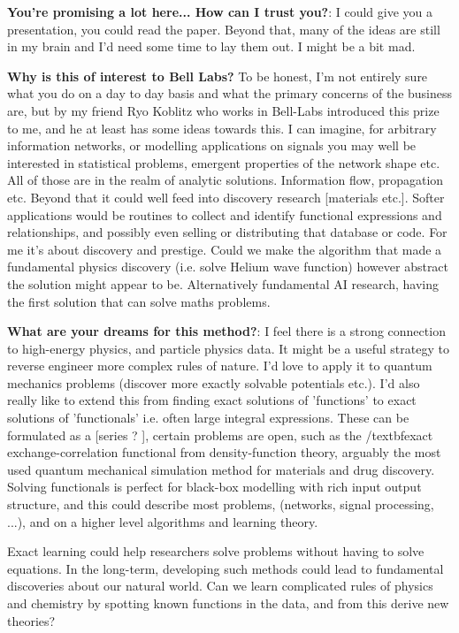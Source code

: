 \documentclass{article}
\begin{document}
\textbf{You're promising a lot here... How can I trust you?}: I could give you a presentation, you could read the paper. Beyond that, many of the ideas are still in my brain and I'd need some time to lay them out. I might be a bit mad. 

\textbf{Why is this of interest to Bell Labs?} To be honest, I'm not entirely sure what you do on a day to day basis and what the primary concerns of the business are, but by my friend Ryo Koblitz who works in Bell-Labs introduced this prize to me, and he at least has some ideas towards this. I can imagine, for arbitrary information networks, or modelling applications on signals you may well be interested in statistical problems, emergent properties of the network shape etc. All of those are in the realm of analytic solutions. Information flow, propagation etc. Beyond that it could well feed into discovery research [materials etc.]. Softer applications would be routines to collect and identify functional expressions and relationships, and possibly even selling or distributing that database or code. For me it's about discovery and prestige. Could we make the algorithm that made a fundamental physics discovery (i.e. solve Helium wave function) however abstract the solution might appear to be. Alternatively fundamental AI research, having the first solution that can solve maths problems. 

\textbf{What are your dreams for this method?}: I feel there is a strong connection to high-energy physics, and particle physics data. It might be a useful strategy to reverse engineer more complex rules of nature. I'd love to apply it to quantum mechanics problems (discover more exactly solvable potentials etc.). I'd also really like to extend this from finding exact solutions of 'functions' to exact solutions of 'functionals' i.e. often large integral expressions. These can be formulated as a [series ? ], certain problems are open, such as the /textbf{exact} exchange-correlation functional from density-function theory, arguably the most used quantum mechanical simulation method for materials and drug discovery. Solving functionals is perfect for black-box modelling with rich input output structure, and this could describe most problems, (networks, signal processing, ...), and on a higher level algorithms and learning theory.


Exact learning could help researchers solve problems without having to solve equations.
In the long-term, developing such methods could lead to fundamental discoveries about our natural world. Can we learn complicated rules of physics and chemistry by spotting known functions in the data, and from this derive new theories?
\end{document}
